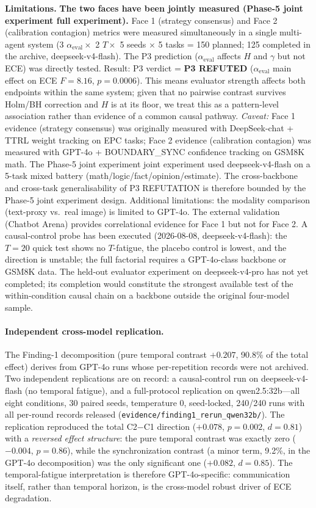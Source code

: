 \documentclass[11pt]{article}
\begin{document}
\textbf{Limitations.} \textbf{The two faces have been jointly measured (Phase-5 joint experiment full experiment).} Face 1 (strategy consensus) and Face 2 (calibration contagion) metrics were measured simultaneously in a single multi-agent system (3 $\alpha_{\text{eval}} \times$ 2 $T \times$ 5 seeds $\times$ 5 tasks = 150 planned; 125 completed in the archive, deepseek-v4-flash). The P3 prediction ($\alpha_{\text{eval}}$ affects $H$ and $\gamma$ but not ECE) was directly tested. Result: P3 verdict = \textbf{P3 REFUTED} ($\alpha_{\text{eval}}$ main effect on ECE $F = 8.16$, $p = 0.0006$). This means evaluator strength affects both endpoints within the same system; given that no pairwise contrast survives Holm/BH correction and $H$ is at its floor, we treat this as a pattern-level association rather than evidence of a common causal pathway. \emph{Caveat:} Face 1 evidence (strategy consensus) was originally measured with DeepSeek-chat + TTRL weight tracking on EPC tasks; Face 2 evidence (calibration contagion) was measured with GPT-4o + BOUNDARY\_SYNC confidence tracking on GSM8K math. The Phase-5 joint experiment joint experiment used deepseek-v4-flash on a 5-task mixed battery (math/logic/fact/opinion/estimate). The cross-backbone and cross-task generalisability of P3 REFUTATION is therefore bounded by the Phase-5 joint experiment design. Additional limitations: the modality comparison (text-proxy vs.\ real image) is limited to GPT-4o. The external validation (Chatbot Arena) provides correlational evidence for Face 1 but not for Face 2. A causal-control probe has been executed (2026-08-08, deepseek-v4-flash): the $T{=}20$ quick test shows no $T$-fatigue, the placebo control is lowest, and the direction is unstable; the full factorial requires a GPT-4o-class backbone or GSM8K data. The held-out evaluator experiment on deepseek-v4-pro has not yet completed; its completion would constitute the strongest available test of the within-condition causal chain on a backbone outside the original four-model sample.

\paragraph{Independent cross-model replication.} The Finding-1 decomposition (pure temporal contrast $+0.207$, 90.8\% of the total effect) derives from GPT-4o runs whose per-repetition records were not archived. Two independent replications are on record: a causal-control run on deepseek-v4-flash (no temporal fatigue), and a full-protocol replication on qwen2.5:32b---all eight conditions, 30 paired seeds, temperature 0, seed-locked, 240/240 runs with all per-round records released (\texttt{evidence/finding1\_rerun\_qwen32b/}). The replication reproduced the total C2$-$C1 direction ($+0.078$, $p = 0.002$, $d = 0.81$) with a \emph{reversed effect structure}: the pure temporal contrast was exactly zero ($-0.004$, $p = 0.86$), while the synchronization contrast (a minor term, 9.2\%, in the GPT-4o decomposition) was the only significant one ($+0.082$, $d = 0.85$). The temporal-fatigue interpretation is therefore GPT-4o-specific: communication itself, rather than temporal horizon, is the cross-model robust driver of ECE degradation.
\end{document}

